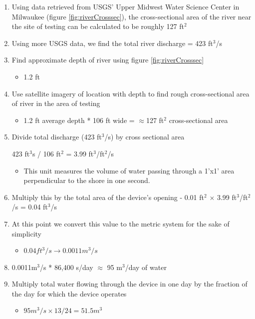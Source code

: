 \documentclass[fleqn,10pt]{SelfArx} %
\begin{document}
	\begin{enumerate}
		\item Using data retrieved from USGS’ Upper Midwest Water Science Center in Milwaukee (figure \ref{fig:riverCrosssec}), the cross-sectional area of the river near the site of testing can be calculated to be roughly 127 ft$^2$
		\item Using more USGS data, we find the total river discharge = 423 ft$^3$/s 
		\item Find approximate depth of river using figure \ref{fig:riverCrosssec} 
		
		\begin{itemize}
			\item 1.2 ft 
		\end{itemize}
		
		\item Use satellite imagery of location with depth to find rough cross-sectional area of river in the area of testing 
		\begin{itemize}
			\item 1.2 ft average depth * 106 ft wide =  $\approx$127 ft$^2$ cross-sectional area
		\end{itemize}
		\item Divide total discharge (423 ft$^3$/s) by cross sectional area 
		
		423 ft$^3$s / 106 ft$^2$ = 3.99 ft$^3$/ft$^2$/s
		
		\begin{itemize}
			\item This unit measures the volume of water passing through a 1’x1’ area perpendicular to the shore in one second. 
		\end{itemize}
		\item Multiply this by the total area of the device’s opening - 0.01 ft$^2$ $\times$ 3.99 ft$^3$/ft$^2$/s = 0.04 ft$^3$/s
		\item At this point we convert this value to the metric system for the sake of simplicity 
		
		\begin{itemize}
			\item $0.04 ft^3/s \rightarrow 0.0011 m^3/s$
		\end{itemize}
		
		\item 0.0011m$^3$/s * 86,400 s/day $\approx$ 95 m$^3$/day of water
		
		\item Multiply total water flowing through the device in one day by the fraction of the day for which the device operates
		
		\begin{itemize}
			\item $95m^3/s \times 13/24 = 51.5m^3$
		\end{itemize}
		
	\end{enumerate}
\end{document}
